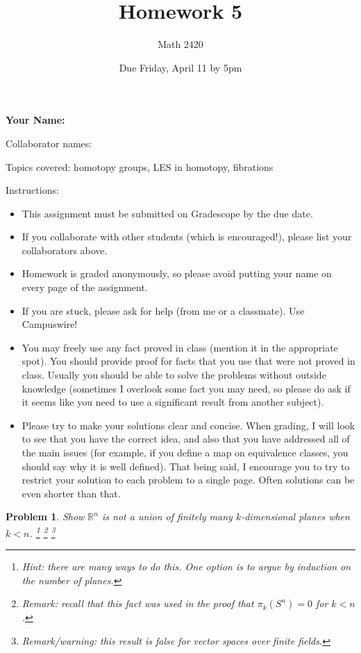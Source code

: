 \documentclass[11pt]{article}
\author{Math 2420}
\date{Due Friday, April 11 by 5pm}
\title{Homework 5}
\newtheorem{problem}{Problem}
\begin{document}
\maketitle

{\bf\Large Your Name:} 

Collaborator names: 


\vspace{.3in}
Topics covered: homotopy groups, LES in homotopy, fibrations

Instructions: 
\begin{itemize}
\item This assignment must be submitted on Gradescope by the due date. 
\item If you collaborate with other students (which is encouraged!), please list your collaborators above. 
\item Homework is graded anonymously, so please avoid putting your name on every page of the assignment.
\item If you are stuck, please ask for help (from me or a classmate). Use Campuswire!  
\item You may freely use any fact proved in class (mention it in the appropriate spot). You should provide proof for facts that you use that were not proved in class. Usually you should be able to solve the problems without outside knowledge (sometimes I overlook some fact you may need, so please do ask if it seems like you need to use a significant result from another subject). 
\item Please try to make your solutions clear and concise. When grading, I will look to see that you have the correct idea, and also that you have addressed all of the main issues (for example, if you define a map on equivalence classes, you should say why it is well defined). That being said, I encourage you to try to restrict your solution to each problem to a single page. Often solutions can be even shorter than that. 
\end{itemize}
\pagebreak 



\pagebreak 


\begin{problem}
Show $\mathbb R^n$ is not a union of finitely many $k$-dimensional planes when $k<n$. 
\footnote{Hint: there are many ways to do this. One option is to argue by induction on the number of planes.} \footnote{Remark: recall that this fact was used in the proof that $\pi_k(S^n)=0$ for $k<n$. } \footnote{Remark/warning: this result is false for vector spaces over finite fields.}
\end{problem}
\end{document}
